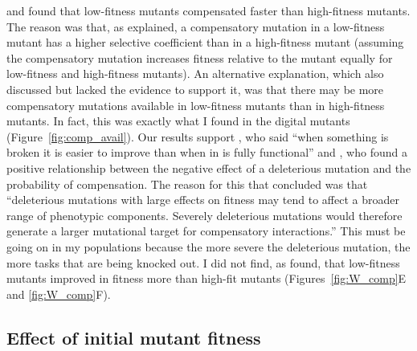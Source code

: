 \begin{doublespace}
\citet{moo00} and \citet{san05}
found that low-fitness mutants compensated faster than high-fitness mutants.
%
The reason was that, as \citet{moo00} explained,
a compensatory mutation in a low-fitness mutant
has a higher selective coefficient than in a high-fitness mutant
(assuming the compensatory mutation increases fitness relative to the mutant
equally for low-fitness and high-fitness mutants).
%
An alternative explanation,
which \citet{moo00} also discussed
but lacked the evidence to support it,
was that there may be more compensatory mutations available
in low-fitness mutants than in high-fitness mutants.
%
In fact, this was exactly what I found
in the digital mutants (Figure~\ref{fig:comp_avail}).
%
Our results support \citet{whi03},
who said ``when something is broken it is easier to improve than
when in is fully functional'' and \citet{poo05b},
who found a positive relationship between the negative effect
of a deleterious mutation and the probability of compensation.
%
The reason for this that \citet{poo05b} concluded was that
``deleterious mutations with large effects
on fitness may tend to affect a broader range of phenotypic components.
Severely deleterious mutations would therefore generate a larger
mutational target for compensatory interactions.''
%
This must be going on in my populations because the more severe
the deleterious mutation, the more tasks that are being knocked out.
%
I did not find, as \citet{san05} found,
that low-fitness mutants improved in fitness more than high-fit mutants
(Figures~\ref{fig:W_comp}E and \ref{fig:W_comp}F).



\subsection{Effect of initial mutant fitness}


\end{doublespace}

